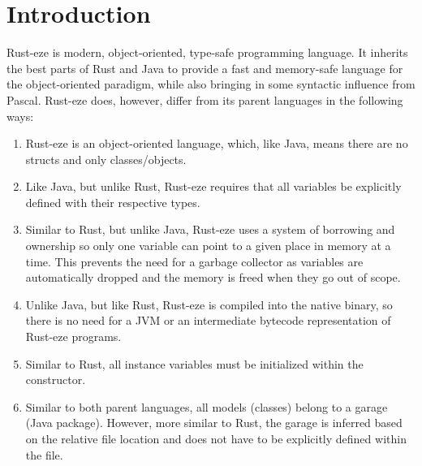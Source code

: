 \documentclass[letterpaper, 10pt, DIV=13]{scrartcl}
\numberwithin{equation}{section}
\numberwithin{figure}{section}
\numberwithin{table}{section}
\begin{document}
\section{Introduction}
Rust-eze is modern, object-oriented, type-safe programming language. It inherits
the best parts of Rust and Java to provide a fast and memory-safe language for
the object-oriented paradigm, while also bringing in some syntactic influence from Pascal.
Rust-eze does, however, differ from its parent languages in the following ways:
\begin{enumerate}
    \item Rust-eze is an object-oriented language, which, like Java, means there
          are no structs and only classes/objects.
    \item Like Java, but unlike Rust, Rust-eze requires that all
          variables be explicitly defined with their respective types.
    \item Similar to Rust, but unlike Java, Rust-eze uses a system of borrowing
          and ownership so only one variable can point to a given place in
          memory at a time. This prevents the need for a garbage collector as
          variables are automatically dropped and the memory is freed when they
          go out of scope.
    \item Unlike Java, but like Rust, Rust-eze is compiled into the native
          binary, so there is no need for a JVM or an intermediate bytecode
          representation of Rust-eze programs.
    \item Similar to Rust, all instance variables must be initialized within the
          constructor.
    \item Similar to both parent languages, all models (classes) belong to a garage
          (Java package). However, more similar to Rust, the garage is inferred
          based on the relative file location and does not have to be explicitly
          defined within the file.
\end{enumerate}

\newpage
\end{document}
